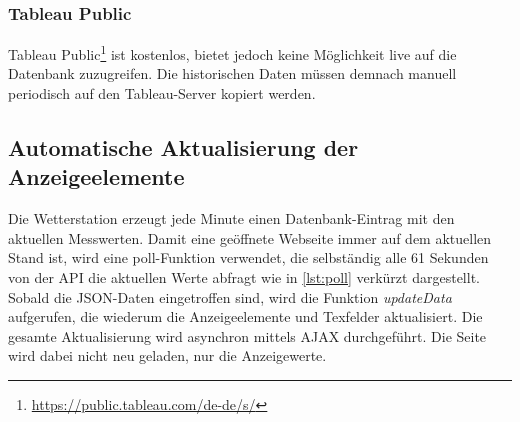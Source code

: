 \subsubsection{Tableau Public}
\newline

Tableau Public\footnote{ \url{https://public.tableau.com/de-de/s/}} ist kostenlos, bietet jedoch keine Möglichkeit live auf die Datenbank zuzugreifen. Die historischen Daten müssen demnach manuell periodisch auf den Tableau-Server kopiert werden.\newline

\newline
{}\newline
{}\newline

\newline
{}\newline





\subsection{Automatische Aktualisierung der Anzeigeelemente}
\newline
Die Wetterstation erzeugt jede Minute einen Datenbank-Eintrag mit den aktuellen Messwerten. Damit eine geöffnete Webseite immer auf dem aktuellen Stand ist, wird eine poll-Funktion verwendet, die selbständig alle 61 Sekunden von der API die aktuellen Werte abfragt wie in \ref{lst:poll} verkürzt dargestellt. Sobald die JSON-Daten eingetroffen sind, wird die Funktion \textit{updateData} aufgerufen, die wiederum die Anzeigeelemente und Texfelder aktualisiert. Die gesamte Aktualisierung wird asynchron mittels AJAX durchgeführt. Die Seite wird dabei nicht neu geladen, nur die Anzeigewerte. \newline


